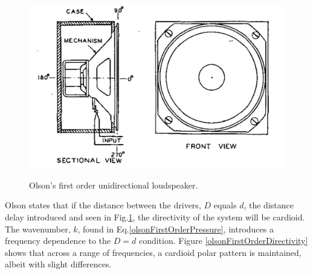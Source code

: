 \documentclass{report}
\begin{document}
        \begin{figure}[H]
            \centering
            \includegraphics[scale=0.4]{figs/olsonFirstOrder.png}%
            \caption{Olson's first order unidirectional loudspeaker.}\cite{olson1973gradient}
            \label{olsonFirstOrderDiagram}
        \end{figure}

        Olson states that if the distance between the drivers, $D$ equals $d$, the distance delay introduced and seen in Fig.\ref{olsonFirstOrderDiagram}, the directivity of the system will be cardioid.
        The wavenumber, $k$, found in Eq.\ref{olsonFirstOrderPressure}, introduces a frequency dependence to the $D=d$ condition.
        Figure \ref{olsonFirstOrderDirectivity} shows that across a range of frequencies, a cardioid polar pattern is maintained, albeit with slight differences.
\end{document}
